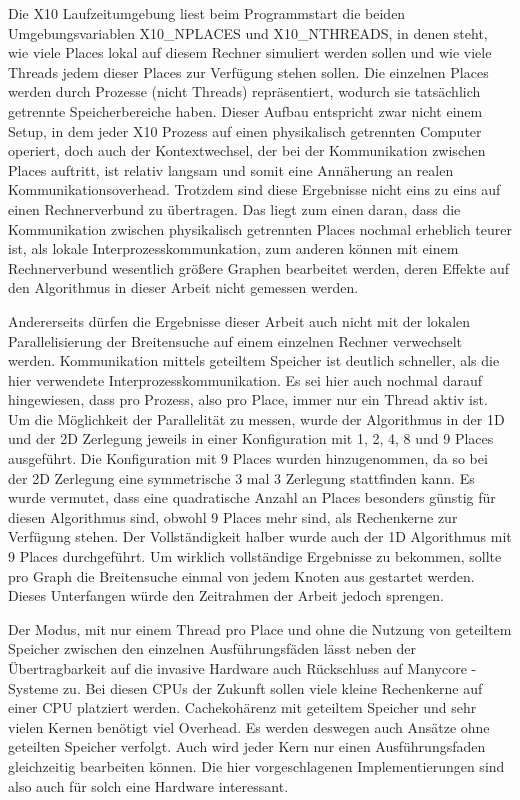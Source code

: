 Die X10 Laufzeitumgebung liest beim Programmstart die beiden Umgebungsvariablen X10\_NPLACES und X10\_NTHREADS, in denen steht, wie viele Places lokal auf diesem Rechner simuliert werden sollen und wie viele Threads jedem dieser Places zur Verfügung stehen sollen. Die einzelnen Places werden durch Prozesse (nicht Threads) repräsentiert, wodurch sie tatsächlich getrennte Speicherbereiche haben. Dieser Aufbau entspricht zwar nicht einem Setup, in dem jeder X10 Prozess auf einen physikalisch getrennten Computer operiert, doch auch der Kontextwechsel, der bei der Kommunikation zwischen Places auftritt, ist relativ langsam und somit eine Annäherung an realen Kommunikationsoverhead. Trotzdem sind diese Ergebnisse nicht eins zu eins auf einen Rechnerverbund zu übertragen. Das liegt zum einen daran, dass die Kommunikation zwischen physikalisch getrennten Places nochmal erheblich teurer ist, als lokale Interprozesskommunkation, zum anderen können mit einem Rechnerverbund wesentlich größere Graphen bearbeitet werden, deren Effekte auf den Algorithmus in dieser Arbeit nicht gemessen werden.

Andererseits dürfen die Ergebnisse dieser Arbeit auch nicht mit der lokalen Parallelisierung der Breitensuche auf einem einzelnen Rechner verwechselt werden. Kommunikation mittels geteiltem Speicher ist deutlich schneller, als die hier verwendete Interprozesskommunikation. Es sei hier auch nochmal darauf hingewiesen, dass pro Prozess, also pro Place, immer nur ein Thread aktiv ist.
Um die Möglichkeit der Parallelität zu messen, wurde der Algorithmus in der 1D und der 2D Zerlegung jeweils in einer Konfiguration mit 1, 2, 4, 8 und 9 Places ausgeführt. Die Konfiguration mit 9 Places wurden hinzugenommen, da so bei der 2D Zerlegung eine symmetrische 3 mal 3 Zerlegung stattfinden kann. Es wurde vermutet, dass eine quadratische Anzahl an Places besonders günstig für diesen Algorithmus sind, obwohl 9 Places mehr sind, als Rechenkerne zur Verfügung stehen. Der Vollständigkeit halber wurde auch der 1D Algorithmus mit 9 Places durchgeführt. Um wirklich vollständige Ergebnisse zu bekommen, sollte pro Graph die Breitensuche einmal von jedem Knoten aus gestartet werden.  Dieses Unterfangen würde den Zeitrahmen der Arbeit jedoch sprengen.

Der Modus, mit nur einem Thread pro Place und ohne die Nutzung von geteiltem Speicher zwischen den einzelnen Ausführungsfäden lässt neben der Übertragbarkeit auf die invasive Hardware auch Rückschluss auf Manycore - Systeme zu. Bei diesen CPUs der Zukunft sollen viele kleine Rechenkerne auf einer CPU platziert werden. Cachekohärenz mit geteiltem Speicher und sehr vielen Kernen benötigt viel Overhead. Es werden deswegen auch Ansätze ohne geteilten Speicher verfolgt. Auch wird jeder Kern nur einen Ausführungsfaden gleichzeitig bearbeiten können. Die hier vorgeschlagenen Implementierungen sind also auch für solch eine Hardware interessant.


